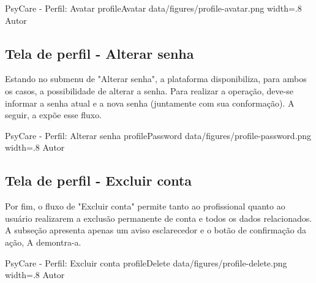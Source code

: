 \image
    {PsyCare - Perfil: Avatar}
    {profileAvatar}
    {data/figures/profile-avatar.png}
    {width=.8\textwidth}
    {Autor}

\subsection{Tela de perfil - Alterar senha}
\label{sec:perfilAvatar}
Estando no submenu de "Alterar senha", a plataforma disponibiliza, para ambos os casos, a possibilidade de alterar a senha. Para realizar a operação, deve-se informar a senha atual e a nova senha (juntamente com sua conformação). A seguir, a  expõe esse fluxo.

\image
    {PsyCare - Perfil: Alterar senha}
    {profilePassword}
    {data/figures/profile-password.png}
    {width=.8\textwidth}
    {Autor}

\subsection{Tela de perfil - Excluir conta}
\label{sec:perfilAvatar}
Por fim, o fluxo de "Excluir conta" permite tanto ao profissional quanto ao usuário realizarem a exclusão permanente de conta e todos os dados relacionados. A subseção apresenta apenas um aviso esclarecedor e o botão de confirmação da ação, A  demontra-a.

\image
    {PsyCare - Perfil: Excluir conta}
    {profileDelete}
    {data/figures/profile-delete.png}
    {width=.8\textwidth}
    {Autor}
